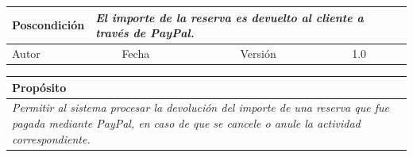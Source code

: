 \begin{table}[H]
\begin{tabular}{llllllll}
        \multicolumn{1}{|l|}{Poscondición}                           & \multicolumn{7}{l|}{{\color[HTML]{808080} \textit{El importe de la reserva es devuelto al cliente a través de PayPal.}}}                                                                                                                                                                                                                                                       \\ \hline
        \multicolumn{1}{|l|}{Autor}                                  & \multicolumn{1}{l|}{{\color[HTML]{808080} \textit{}}}                           & \multicolumn{2}{l|}{Fecha}                                                   & \multicolumn{1}{l|}{}                          & \multicolumn{2}{l|}{Versión}                                                      & \multicolumn{1}{l|}{1.0}                                                     \\ \hline
        \end{tabular}
        \end{table}

        \begin{table}[H]
            \begin{tabular}{llllllll}
        \hline
        \multicolumn{8}{|l|}{\cellcolor[HTML]{F2F2F2}Propósito}                                                                                                                                                                                                                                                                                                                                                                                           \\ \hline
        \multicolumn{8}{|p{15cm}|}{{\color[HTML]{808080} \textit{Permitir al sistema procesar la devolución del importe de una reserva que fue pagada mediante PayPal, en caso de que se cancele o anule la actividad correspondiente.}}}                                                                                                                                                                                                             \\ \hline
        \end{tabular}
        \end{table}

